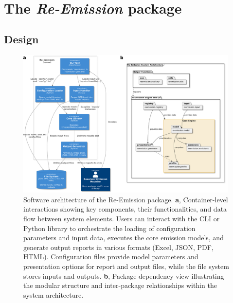 \documentclass[final,1p,times]{elsarticle}
\begin{document}

\section{The \emph{Re-Emission} package}
\label{sec:reemission}

\subsection{Design}
\label{subsec:design}

\begin{figure}[ht]
    \centering
    \includegraphics[width=0.99\textwidth]{figures/high_level_achitecture.pdf}
    \caption{Software architecture of the Re-Emission package. \textbf{a}, Container-level interactions showing key components, their functionalities, and data flow between system elements. Users can interact with the \acf{CLI} or Python library to orchestrate the loading of configuration parameters and input data, executes the core emission models, and generate output reports in various formats (Excel, JSON, PDF, HTML). Configuration files provide model parameters and presentation options for report and output files, while the file system stores inputs and outputs. \textbf{b}, Package dependency view illustrating the modular structure and inter-package relationships within the system architecture.}
    \label{fig:high_level_archtecture}
\end{figure}
\end{document}
